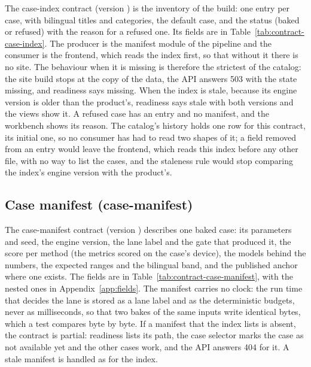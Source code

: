 The case-index contract (version ) is the inventory of the build: one entry per case, with bilingual titles and categories, the default case, and the status (baked or refused) with the reason for a refused one. Its fields are in Table~\ref{tab:contract-case-index}. The producer is the manifest module of the pipeline and the consumer is the frontend, which reads the index first, so that without it there is no site. The behaviour when it is missing is therefore the strictest of the catalog: the site build stops at the copy of the data, the API answers 503 with the state missing, and readiness says missing. When the index is stale, because its engine version is older than the product's, readiness says stale with both versions and the views show it. A refused case has an entry and no manifest, and the workbench shows its reason. The catalog's history holds one row for this contract, its initial one, so no consumer has had to read two shapes of it; a field removed from an entry would leave the frontend, which reads this index before any other file, with no way to list the cases, and the staleness rule would stop comparing the index's engine version with the product's.



\subsection{Case manifest (case-manifest)}\label{sec:data-case-manifest}

The case-manifest contract (version ) describes one baked case: its parameters and seed, the engine version, the lane label and the gate that produced it, the score per method (the metrics scored on the case's device), the models behind the numbers, the expected ranges and the bilingual band, and the published anchor where one exists. The fields are in Table~\ref{tab:contract-case-manifest}, with the nested ones in Appendix~\ref{app:fields}. The manifest carries no clock: the run time that decides the lane is stored as a lane label and as the deterministic budgets, never as milliseconds, so that two bakes of the same inputs write identical bytes, which a test compares byte by byte. If a manifest that the index lists is absent, the contract is partial: readiness lists its path, the case selector marks the case as not available yet and the other cases work, and the API answers 404 for it. A stale manifest is handled as for the index.

